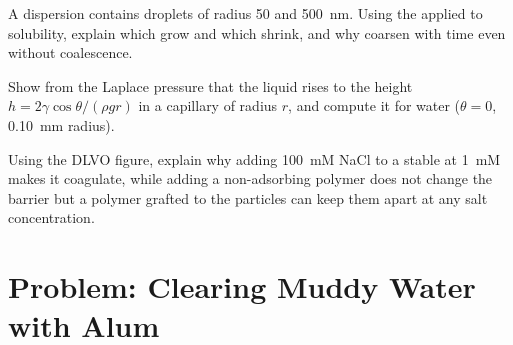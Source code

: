 \begin{exercise}[$\star\star\star$]\label{exo:b3:colloids:10}
A dispersion contains droplets of radius 50 and \qty{500}{nm}. Using the  applied to solubility, explain which grow and which shrink, and why
 coarsen with time even without coalescence.
\end{exercise}

\begin{exercise}[$\star\star\star$]\label{exo:b3:colloids:11}
Show from the Laplace pressure that the liquid rises to the height $h = 2\gamma\cos\theta/(\rho gr)$ in a
capillary of radius $r$, and compute it for water ($\theta = 0$, \qty{0.10}{mm} radius).
\end{exercise}

\begin{exercise}[$\star\star\star$]\label{exo:b3:colloids:12}
Using the DLVO figure, explain why adding \qty{100}{mM} NaCl to a  stable at \qty{1}{mM}
makes it coagulate, while adding a non-adsorbing polymer does not change the
barrier but a polymer grafted to the particles can keep them apart at any salt
concentration.
\end{exercise}

\clearpage
\enlargethispage{3\baselineskip}
\section{Problem: Clearing Muddy Water with Alum}

